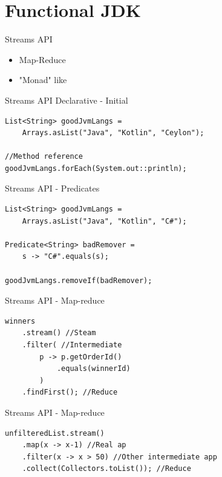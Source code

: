 \documentclass[14pt]{beamer}
\begin{document}
\section{Functional JDK}
\begin{frame}[fragile]{Streams API}
    \begin{itemize}
        \item Map-Reduce
        \item "Monad" like
    \end{itemize}
    
\end{frame}

\begin{frame}[fragile]{Streams API}
Declarative - Initial
\begin{lstlisting}
List<String> goodJvmLangs = 
	Arrays.asList("Java", "Kotlin", "Ceylon");

//Method reference
goodJvmLangs.forEach(System.out::println);

\end{lstlisting}
\end{frame}


\begin{frame}[fragile]{Streams API - Predicates}
\begin{lstlisting}
List<String> goodJvmLangs = 
	Arrays.asList("Java", "Kotlin", "C#");

Predicate<String> badRemover = 
	s -> "C#".equals(s);
	
goodJvmLangs.removeIf(badRemover);
\end{lstlisting}
\end{frame}


\begin{frame}[fragile]{Streams API - Map-reduce}
\begin{lstlisting}
winners
	.stream() //Steam
	.filter( //Intermediate
		p -> p.getOrderId()
			.equals(winnerId)
		)
	.findFirst(); //Reduce
\end{lstlisting}
\end{frame}


\begin{frame}[fragile]{Streams API - Map-reduce}
    \begin{lstlisting}
unfilteredList.stream()
    .map(x -> x-1) //Real ap
    .filter(x -> x > 50) //Other intermediate app
    .collect(Collectors.toList()); //Reduce
    \end{lstlisting}
\end{frame}
\end{document}
